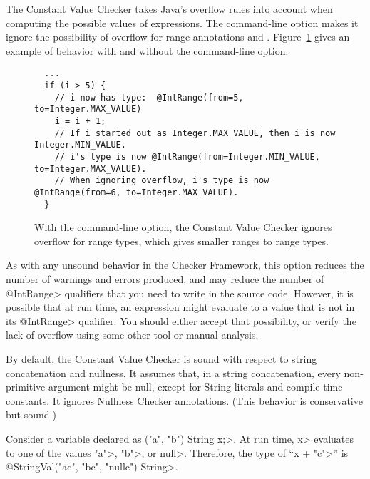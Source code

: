
The Constant Value Checker takes Java's overflow rules into account when
computing the possible values of expressions.
%
The  command-line option makes it ignore the
possibility of overflow for range annotations
 and
.
%
Figure~\ref{fig-value-ignore-overflow} gives an example of behavior with
and without the  command-line option.

\begin{figure}
\begin{Verbatim}
  ...
  if (i > 5) {
    // i now has type:  @IntRange(from=5, to=Integer.MAX_VALUE)
    i = i + 1;
    // If i started out as Integer.MAX_VALUE, then i is now Integer.MIN_VALUE.
    // i's type is now @IntRange(from=Integer.MIN_VALUE, to=Integer.MAX_VALUE).
    // When ignoring overflow, i's type is now @IntRange(from=6, to=Integer.MAX_VALUE).
  }
\end{Verbatim}
\caption{With the  command-line option,
the Constant Value Checker ignores overflow
for range types, which gives smaller ranges to range types.}
\label{fig-value-ignore-overflow}
\end{figure}

As with any unsound behavior in the Checker Framework, this option reduces
the number of warnings and errors produced, and may reduce the number of
\<@IntRange> qualifiers that you need to write in the source code.
However, it is possible that at run time, an expression might evaluate to a
value that is not in its \<@IntRange> qualifier.  You should either accept
that possibility, or verify the lack of overflow using some other tool or
manual analysis.



By default, the Constant Value Checker is sound with respect to string
concatenation and nullness.  It assumes that, in a string concatenation,
every non-primitive argument might be null, except for String literals
and compile-time constants. It ignores Nullness Checker annotations.
(This behavior is conservative but sound.)

Consider a variable declared as
\<("a", "b") String x;>.
At run time, \<x> evaluates to one of the values \<"a">, \<"b">, or
\<null>.
Therefore, the type of ``\<x + "c">'' is
\<@StringVal("ac", "bc", "nullc") String>.

